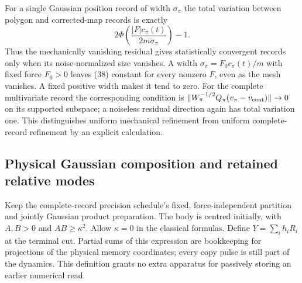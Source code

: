 \documentclass[11pt,a4paper]{article}
\begin{document}
For a single Gaussian position record of width \(\sigma_\pi\) the total
variation between polygon and corrected-map records is exactly
\[2\Phi\left(\frac{|F|c_\pi(t)}{2m\sigma_\pi}\right)-1.\tag{38}\] Thus
the mechanically vanishing residual gives statistically convergent
records only when its noise-normalized size vanishes. A width
\(\sigma_\pi=F_0c_\pi(t)/m\) with fixed force \(F_0>0\) leaves (38)
constant for every nonzero \(F\), even as the mesh vanishes. A fixed
positive width makes it tend to zero. For the complete multivariate
record the corresponding condition is
\(\|W_\pi^{-1/2}Q_\pi(v_\pi-v_{\rm cont})\|\to0\) on its supported
subspace; a noiseless residual direction again has total variation one.
This distinguishes uniform mechanical refinement from uniform
complete-record refinement by an explicit calculation.

\hypertarget{physical-gaussian-composition-and-retained-relative-modes}{%
\subsection{Physical Gaussian composition and retained relative
modes}\label{physical-gaussian-composition-and-retained-relative-modes}}

Keep the complete-record precision schedule's fixed, force-independent
partition and jointly Gaussian product preparation. The body is centred
initially, with \(A,B>0\) and \(AB\ge\kappa^2\). Allow \(\kappa=0\) in
the classical formulas. Define \(Y=\sum_i h_iR_i\) at the terminal cut.
Partial sums of this expression are bookkeeping for projections of the
physical memory coordinates; every copy pulse is still part of the
dynamics. This definition grants no extra apparatus for passively
storing an earlier numerical read.
\end{document}
